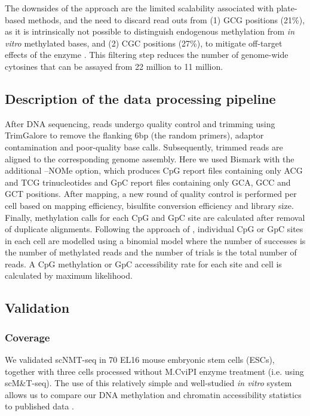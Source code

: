 The downsides of the approach are the limited scalability associated with plate-based methods, and the need to discard read outs from (1) GCG positions (21\%), as it is intrinsically not possible to distinguish endogenous methylation from \textit{in vitro} methylated bases, and (2) CGC positions (27\%), to mitigate off-target effects of the enzyme \cite{Kelly2012}. This filtering step reduces the number of genome-wide cytosines that can be assayed from 22 million to 11 million. 


\subsection{Description of the data processing pipeline}

After DNA sequencing, reads undergo quality control and trimming using TrimGalore to remove the flanking 6bp (the random primers), adaptor contamination and poor-quality base calls. Subsequently, trimmed reads are aligned to the corresponding genome assembly. Here we used Bismark \cite{Krueger2011} with the additional --NOMe option, which produces CpG report files containing only ACG and TCG trinucleotides and GpC report files containing only GCA, GCC and GCT positions. After mapping, a new round of quality control is performed per cell based on mapping efficiency, bisulfite conversion efficiency and library size.\\
Finally, methylation calls for each CpG and GpC site are calculated after removal of duplicate alignments. Following the approach of \cite{Smallwood2014}, individual CpG or GpC sites in each cell are modelled using a binomial model where the number of successes is the number of methylated reads and the number of trials is the total number of reads. A CpG methylation or GpC accessibility rate for each site and cell is calculated by maximum likelihood.


\subsection{Validation}

\subsubsection{Coverage} \label{section:scnmt_coverage}
We validated scNMT-seq in 70 EL16 mouse embryonic stem cells (ESCs), together with three cells processed without M.CviPI enzyme treatment (i.e. using scM\&T-seq). The use of this relatively simple and well-studied \textit{in vitro} system allows us to compare our DNA methylation and chromatin accessibility statistics to published data \cite{Smallwood2014,Angermueller2016,Ficz2013}.

